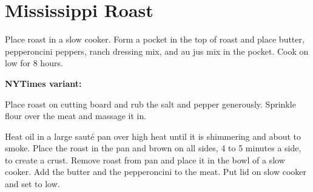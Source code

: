 \section{Mississippi Roast}
\begin{recipe}
	
	

	Place roast in a slow cooker. Form a pocket in the top of roast and place butter, pepperoncini peppers, ranch dressing mix, and au jus mix in the pocket. Cook on low for 8 hours.

	\textbf{NYTimes variant:}
	
	
	
	Place roast on cutting board and rub the salt and pepper generously. Sprinkle flour over the meat and massage it in.
	
	Heat oil in a large saut\'{e} pan over high heat until it is shimmering and about to smoke. Place the roast in the pan and brown on all sides, 4 to 5 minutes a side, to create a crust. Remove roast from pan and place it in the bowl of a slow cooker. Add the butter and the pepperoncini to the meat. Put lid on slow cooker and set to low.
	

\end{recipe}
